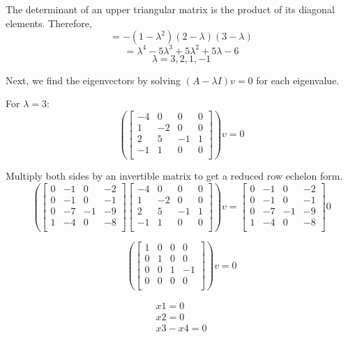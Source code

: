 \documentclass[11pt,addpoints]{exam}
\begin{document}
\begin{questions}
The determinant of an upper triangular matrix is the product of its diagonal elements. Therefore,
\[ = -(1-\lambda^2)(2-\lambda)(3-\lambda)\]
\[ = \lambda^4 - 5\lambda^3 + 5\lambda^2 + 5\lambda - 6  \]
\[\lambda = 3, 2, 1, -1 \]

Next, we find the eigenvectors by solving $(A - \lambda I)v = 0$ for each eigenvalue. 

For $\lambda  = 3$:
\[
\left(\begin{bmatrix}
-4 & 0 & 0 & 0 \\
1 & -2 & 0 & 0 \\
2 & 5 & -1 & 1 \\
-1 & 1 & 0 & 0 \\
\end{bmatrix}\right)v = 0
\]

Multiply both sides by an invertible matrix to get a reduced row echelon form.
\[
\left(
\begin{bmatrix}
0 & -1 & 0 & -2 \\
0 & -1 & 0 & -1 \\
0 & -7 & -1 & -9 \\
1 & -4 & 0 & -8 \\
\end{bmatrix}
\begin{bmatrix}
-4 & 0 & 0 & 0 \\
1 & -2 & 0 & 0 \\
2 & 5 & -1 & 1 \\
-1 & 1 & 0 & 0 \\
\end{bmatrix}\right)v = 
\begin{bmatrix}
0 & -1 & 0 & -2 \\
0 & -1 & 0 & -1 \\
0 & -7 & -1 & -9 \\
1 & -4 & 0 & -8 \\
\end{bmatrix}0
\]

\[
\left(\begin{bmatrix}
1 & 0 & 0 & 0 \\
0 & 1 & 0 & 0 \\
0 & 0 & 1 & -1 \\
0 & 0 & 0 & 0 \\
\end{bmatrix}\right)v = 0
\]

\begin{align*}
x1 = 0\\
x2 = 0\\
x3 - x4 = 0
\end{align*}


\end{questions}
\end{document}
